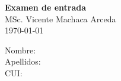\documentclass{article}
\newcommand{\csdocente}{MSc. Vicente Machaca Arceda}
\newcommand{\cscurso}{Bioinformática}
\newcommand{\csescuela}{Escuela Profesional de Ciencia de la Computación}
\newcommand{\cspracnr}{}
\newcommand{\cstema}{-}
\begin{document}
	
	
	
	\begin{center}	
		\fontsize{15}{15} \textbf{Examen de entrada} \\ \vspace{0.25cm}
		\csdocente \\
		\today \\ \vspace{0.25cm}
	\end{center}

	\begin{flushleft}
	Nombre: \\
	Apellidos:\\
	CUI:\\
	\end{flushleft}
	
	
	
	

	
\end{document}
